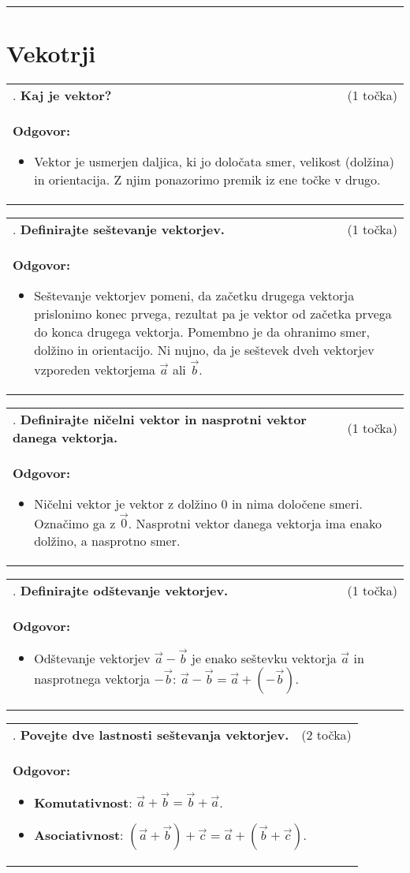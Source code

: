 \documentclass[12pt]{article}
\newcounter{vprasanje}[section]
\renewcommand{\thevprasanje}{\roman{vprasanje}}
\newcommand{\vprasanje}[2]{%
  \stepcounter{vprasanje}%
  \textbf{\thevprasanje}. \textbf{#1} & (#2) \\
}
\newcommand{\odgovor}[1]{%
  \multicolumn{2}{p{\dimexpr\textwidth-2\tabcolsep\relax}}{%
    \small \textbf{Odgovor:} #1%
  } \\[1em]%
}
\newcommand{\crta}{\rule{\textwidth}{0.4pt}}
\newcommand{\naslov}[1]{%
  \vspace{1em} 
  \section{#1}
  \addcontentsline{toc}{section}{\protect\numberline{}#1}%
}
\begin{document}
\crta

\naslov{Vekotrji}

\begin{tabularx}{\textwidth}{X r}
\vprasanje{Kaj je vektor?}{1 točka}
\odgovor{
\begin{itemize}
	\item Vektor je usmerjen daljica, ki jo določata smer, velikost (dolžina) in orientacija. Z njim ponazorimo premik iz ene točke v drugo.
\end{itemize}
}
\end{tabularx}

\begin{tabularx}{\textwidth}{X r}
\vprasanje{Definirajte seštevanje vektorjev.}{1 točka}
\odgovor{
\begin{itemize}
	\item Seštevanje vektorjev pomeni, da začetku drugega vektorja prislonimo konec prvega, rezultat pa je vektor od začetka prvega do konca drugega vektorja. Pomembno je da ohranimo smer, dolžino in orientacijo. Ni nujno, da je seštevek dveh vektorjev vzporeden vektorjema $\vec{a}$ ali $\vec{b}$.
\end{itemize}
}
\end{tabularx}

\begin{tabularx}{\textwidth}{X r}
\vprasanje{Definirajte ničelni vektor in nasprotni vektor danega vektorja.}{1 točka}
\odgovor{
\begin{itemize}
	\item Ničelni vektor je vektor z dolžino 0 in nima določene smeri. Označimo ga z $\vec{0}$. Nasprotni vektor danega vektorja ima enako dolžino, a nasprotno smer.
\end{itemize}
}
\end{tabularx}

\begin{tabularx}{\textwidth}{X r}
\vprasanje{Definirajte odštevanje vektorjev.}{1 točka}
\odgovor{
\begin{itemize}
	\item Odštevanje vektorjev $\vec{a} - \vec{b}$ je enako seštevku vektorja $\vec{a}$ in nasprotnega vektorja $-\vec{b}$: $\vec{a} - \vec{b} = \vec{a} + (-\vec{b})$.
\end{itemize}
}
\end{tabularx}

\begin{tabularx}{\textwidth}{X r}
\vprasanje{Povejte dve lastnosti seštevanja vektorjev.}{2 točka}
\odgovor{
\begin{itemize}
  \item \textbf{Komutativnost}: $\vec{a} + \vec{b} = \vec{b} + \vec{a}$.
  \item \textbf{Asociativnost}: $(\vec{a} + \vec{b}) + \vec{c} = \vec{a} + (\vec{b} + \vec{c})$.
\end{itemize}
}
\end{tabularx}
\end{document}
